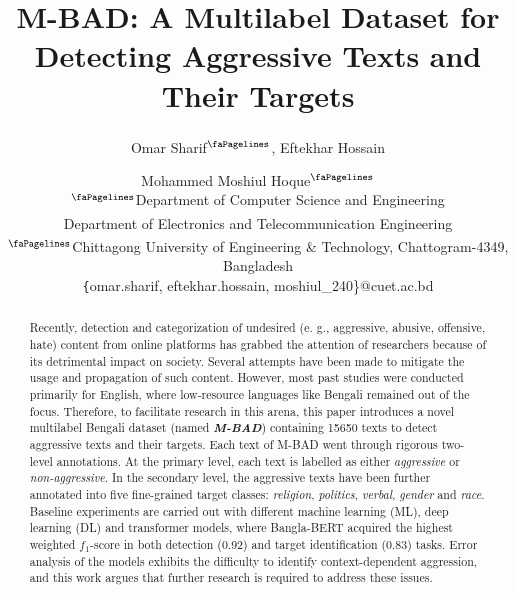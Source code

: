 \documentclass[11pt]{article}
\title{M-BAD: A Multilabel Dataset for Detecting Aggressive Texts and Their Targets}
\author{Omar Sharif$^\mathbf{{\faPagelines}}$, Eftekhar Hossain{\textsuperscript{\faDollar}}\and Mohammed Moshiul Hoque$^\mathbf{{\faPagelines}}$\\
  {$^{\faPagelines}$}Department of Computer Science and Engineering \\
  \textsuperscript{{\faDollar}}Department of Electronics and Telecommunication Engineering\\
  {\textsuperscript{\faDollar}$^{\faPagelines}$}Chittagong University of Engineering \& Technology, Chattogram-4349, Bangladesh \\
         \texttt\{omar.sharif, eftekhar.hossain, moshiul\_240\}@cuet.ac.bd\\}
\begin{document}
\maketitle
\begin{abstract}
Recently, detection and categorization of undesired (e. g., aggressive, abusive, offensive, hate) content from online platforms has grabbed the attention of researchers because of its detrimental impact on society. Several attempts have been made to mitigate the usage and propagation of such content. However, most past studies were conducted primarily for English, where low-resource languages like Bengali remained out of the focus. Therefore, to facilitate research in this arena, this paper introduces a novel multilabel Bengali dataset (named \textit{\textbf{M-BAD}}) containing 15650 texts to detect aggressive texts and their targets. Each text of M-BAD went through rigorous two-level annotations. At the primary level, each text is labelled as either \textit{aggressive} or \textit{non-aggressive}. In the secondary level, the aggressive texts have been further annotated into five fine-grained target classes: \textit{religion}, \textit{politics}, \textit{verbal}, \textit{gender} and \textit{race}. Baseline experiments are carried out with different machine learning (ML), deep learning (DL) and transformer models, where Bangla-BERT acquired the highest weighted $f_1$-score in both detection (0.92) and target identification (0.83) tasks. Error analysis of the models exhibits the difficulty to identify context-dependent aggression, and this work argues that further research is required to address these issues.
\end{abstract}
\end{document}
